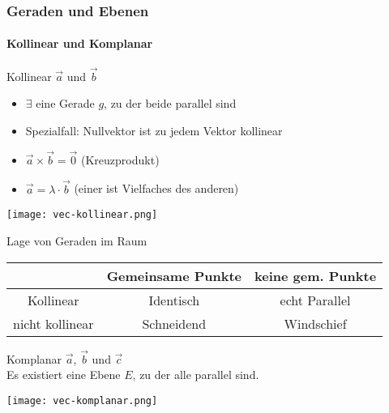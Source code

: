 \raggedcolumns


\subsubsection*{Geraden und Ebenen}

\paragraph*{Kollinear und Komplanar}   

\begin{definition}{Kollinear} $\vec{a}$ und $\vec{b}$\\
    \begin{minipage}{0.8\linewidth}
    \begin{itemize}
        \item $\exists$ eine Gerade $g$, zu der beide parallel sind
        \item Spezialfall: Nullvektor ist zu jedem Vektor kollinear
        \item $\vec{a} \times \vec{b} = \vec{0}$ (Kreuzprodukt)
        \item $\vec{a}=\lambda\cdot\vec{b}$ (einer ist Vielfaches des anderen)
    \end{itemize}
    \end{minipage}
    \hspace{3mm}
    \begin{minipage}{0.1\linewidth}
        \texttt{[image: vec-kollinear.png]}
    \end{minipage}
\end{definition}

\begin{theorem}{Lage} von Geraden im Raum\\
    \vspace*{2mm}
    \begin{tabular}{c|c|c|}
        & Gemeinsame Punkte & keine gem. Punkte \\
        \hline
        Kollinear & Identisch & echt Parallel \\
        \hline
        nicht kollinear & Schneidend & Windschief \\
        \hline
    \end{tabular}
\end{theorem}

\begin{minipage}{0.8\linewidth}
\begin{definition}{Komplanar} $\vec{a}$, $\vec{b}$ und $\vec{c}$\\
    Es existiert eine Ebene $E$, zu der alle parallel sind.
\end{definition}
\end{minipage}
\begin{minipage}{0.15\linewidth}
    \texttt{[image: vec-komplanar.png]}
\end{minipage}

